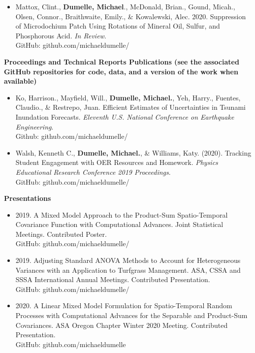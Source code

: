 \documentclass[line, margin, 10pt]{res}\usepackage[]{graphicx}\usepackage[]{color}
\begin{document}
\begin{resume}
\begin{itemize}
\item Mattox, Clint., \textbf{Dumelle, Michael}., McDonald, Brian., Gound, Micah., Olsen, Connor., Braithwaite, Emily., \& Kowalewski, Alec. 2020. Suppression of Microdochium Patch Using Rotations of Mineral Oil, Sulfur, and Phosphorous Acid. \emph{In Review}. \\
GitHub: github.com/michaeldumelle/

\end{itemize}


\textbf{Proceedings and Technical Reports Publications (see the associated GitHub repositories for code, data, and a version of the work when available)}

\begin{itemize}
	
	\item Ko, Harrison., Mayfield, Will., \textbf{Dumelle, Michael.}, Yeh, Harry., Fuentes, Claudio., \& Restrepo, Juan. Efficient Estimates of Uncertainties in Tsunami Inundation Forecasts. \emph{Eleventh U.S. National Conference on Earthquake Engineering}. \\
	Github: github.com/michaeldumelle/
	
	\item Walsh, Kenneth C., \textbf{Dumelle, Michael.}, \& Williams, Katy. (2020). Tracking Student Engagement with OER Resources and Homework. \emph{Physics Educational Research Conference 2019 Proceedings}. \\
	GitHub: github.com/michaeldumelle/
	
\end{itemize}

\textbf{Presentations}

\begin{itemize}
	
	\item 2019. A Mixed Model Approach to the Product-Sum Spatio-Temporal Covariance Function with Computational Advances. Joint Statistical Meetings. Contributed Poster. \\
	GitHub: github.com/michaeldumelle/

	\item 2019. Adjusting Standard ANOVA Methods to Account for Heterogeneous Variances with an Application to Turfgrass Management. ASA, CSSA and SSSA International Annual Meetings. Contributed Presentation. \\
	GitHub: github.com/michaeldumelle/

	\item 2020. A Linear Mixed Model Formulation for Spatio-Temporal Random Processes with Computational Advances for the Separable and Product-Sum Covariances. ASA Oregon Chapter Winter 2020 Meeting. Contributed Presentation. \\
	GitHub: github.com/michaeldumelle


\end{itemize}
\end{resume}
\end{document}
